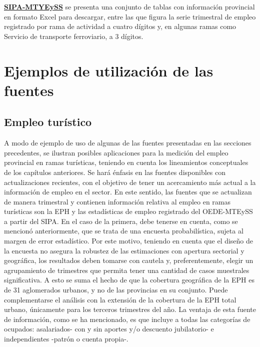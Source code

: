 \documentclass[
  openany]{book}
\begin{document}
\href{https://www.trabajo.gob.ar/estadisticas/oede/estadisticasregionales.asp}{\textbf{SIPA-MTYEySS}} se presenta una conjunto de tablas con información provincial en formato Excel para descargar, entre las que figura la serie trimestral de empleo registrado por rama de actividad a cuatro dígitos y, en algunas ramas como Servicio de transporte ferroviario, a 3 dígitos.

\hypertarget{ejemplos-de-utilizaciuxf3n-de-las-fuentes}{%
\section{Ejemplos de utilización de las fuentes}\label{ejemplos-de-utilizaciuxf3n-de-las-fuentes}}

\hypertarget{empleo-turuxedstico}{%
\subsection{Empleo turístico}\label{empleo-turuxedstico}}

A modo de ejemplo de uso de algunas de las fuentes presentadas en las secciones precedentes, se ilustran posibles aplicaciones para la medición del empleo provincial en ramas turísticas, teniendo en cuenta los lineamientos conceptuales de los capítulos anteriores. Se hará énfasis en las fuentes disponibles con actualizaciones recientes, con el objetivo de tener un acercamiento más actual a la información de empleo en el sector. En este sentido, las fuentes que se actualizan de manera trimestral y contienen información relativa al empleo en ramas turísticas son la EPH y las estadísticas de empleo registrado del OEDE-MTEySS a partir del SIPA. En el caso de la primera, debe tenerse en cuenta, como se mencionó anteriormente, que se trata de una encuesta probabilística, sujeta al margen de error estadístico. Por este motivo, teniendo en cuenta que el diseño de la encuesta no asegura la robustez de las estimaciones con apertura sectorial y geográfica, los resultados deben tomarse con cautela y, preferentemente, elegir un agrupamiento de trimestres que permita tener una cantidad de casos muestrales significativa. A esto se suma el hecho de que la cobertura geográfica de la EPH es de 31 aglomerados urbanos, y no de las provincias en su conjunto. Puede complementarse el análisis con la extensión de la cobertura de la EPH total urbano, únicamente para los terceros trimestres del año. La ventaja de esta fuente de información, como se ha mencionado, es que incluye a todas las categorías de ocupados: asalariados- con y sin aportes y/o descuento jubilatorio- e independientes -patrón o cuenta propia-.
\end{document}

